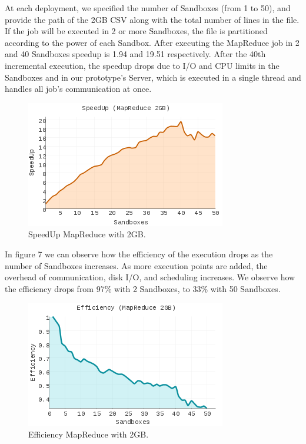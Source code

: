 \documentclass[10pt,reprint]{socc14}
\begin{document}
At each deployment, we specified the number of Sandboxes (from 1 to 50), and provide the path of the 2GB CSV along with the total number of lines in the file. If the job will be executed in 2 or more Sandboxes, the file is partitioned according to the power of each Sandbox. After executing the MapReduce job in 2 and 40 Sandboxes speedup is 1.94 and 19.51 respectively. After the 40th incremental execution, the speedup drops due to I/O and CPU limits in the Sandboxes and in our prototype’s Server, which is executed in a single thread and handles all job’s communication at once.


\begin{figure}	
	\centering
	\includegraphics[scale=2.5]{SpeedUp_MapReduce_2GB_Small}
	\caption{SpeedUp MapReduce with 2GB.}
\end{figure}


In figure 7 we can observe how the efficiency of the execution drops as the number of Sandboxes increases. As more execution points are added, the overhead of communication, disk I/O, and scheduling increases. We observe how the efficiency drops from 97\% with 2 Sandboxes, to 33\% with 50 Sandboxes.


\begin{figure}	
	\centering
	\includegraphics[scale=2.5]{Efficiency_MapReduce_2GB_small}
	\caption{Efficiency MapReduce with 2GB.}
\end{figure}
\end{document}
